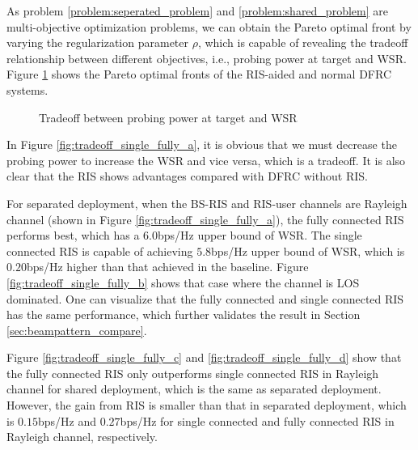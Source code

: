 As problem \eqref{problem:seperated_problem} and \eqref{problem:shared_problem} are multi-objective optimization problems, we can obtain
the Pareto optimal front by varying the regularization parameter $\rho$, which is
capable of revealing the tradeoff relationship between different objectives, i.e., 
probing power at target and WSR. Figure \ref{fig:tradeoff_single_fully} shows the Pareto optimal fronts 
of the RIS-aided and normal DFRC systems.

\begin{figure}[h]
    \centering
    \caption{Tradeoff between probing power at target and WSR}
    \label{fig:tradeoff_single_fully}
\end{figure}

In Figure \ref{fig:tradeoff_single_fully_a}, it is obvious that we must decrease the probing power to increase 
the WSR and vice versa, which is a tradeoff. It is also clear that the RIS shows advantages 
compared with DFRC without RIS. 

For separated deployment, when the BS-RIS and RIS-user channels are Rayleigh channel (shown in Figure \ref{fig:tradeoff_single_fully_a}), 
the fully connected RIS performs best, which has a $6.0$bps/Hz upper bound of WSR. The single connected RIS is capable of 
achieving $5.8$bps/Hz upper bound of WSR, which is $0.20$bps/Hz higher than that achieved in the baseline. Figure \ref{fig:tradeoff_single_fully_b} 
shows that case where the channel is LOS dominated. One can visualize that the fully connected and single connected RIS has the same 
performance, which further validates the result in Section \ref{sec:beampattern_compare}.

Figure \ref{fig:tradeoff_single_fully_c} and \ref{fig:tradeoff_single_fully_d} show that the fully connected RIS only outperforms single connected RIS in Rayleigh channel for 
shared deployment, which is the same as separated deployment. However, the gain from RIS is smaller than that in separated deployment,
which is $0.15$bps/Hz and $0.27$bps/Hz for single connected and fully connected RIS in Rayleigh channel, respectively.

